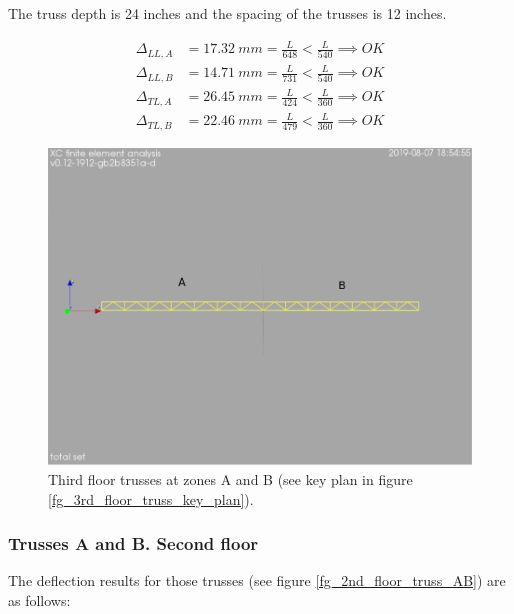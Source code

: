 \noindent The truss depth is 24 inches and the spacing of the trusses is 12 inches.

\begin{align}
\Delta_{LL,A} &= 17.32\ mm= \frac{L}{648} < \frac{L}{540} \implies OK \\
\Delta_{LL,B} &= 14.71\ mm= \frac{L}{731} < \frac{L}{540} \implies OK \\
\Delta_{TL,A} &= 26.45\ mm= \frac{L}{424} < \frac{L}{360} \implies OK \\
\Delta_{TL,B} &= 22.46\ mm= \frac{L}{479} < \frac{L}{360} \implies OK
\end{align}


\begin{figure}
  \begin{center}
  \includegraphics[width=120mm]{figures/floor_truss_AB}
  \end{center}
  \caption{Third floor trusses at zones A and B (see key plan in figure \ref{fg_3rd_floor_truss_key_plan}).}\label{fg_floor_truss_AB}
\end{figure}

\subsubsection{Trusses A and B. Second floor}
The deflection results for those trusses (see figure \ref{fg_2nd_floor_truss_AB}) are as follows:


